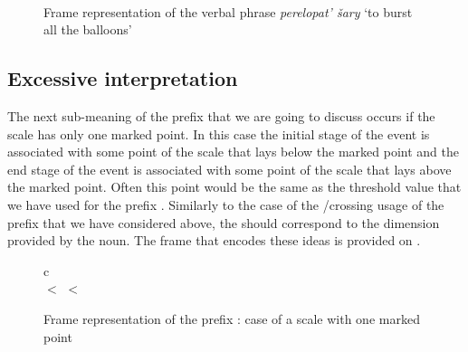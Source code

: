 \begin{figure}
\centering
{}\\
\hfill
\caption{Frame representation of the verbal phrase \textit{perelopat' \v{s}ary} `to burst all the balloons' \label{frame:pereburst:balloon}}
\end{figure}

\subsection{Excessive interpretation}
The next sub-meaning of the prefix  that we are going to discuss occurs if the scale has only one marked point. In this case the initial stage of the event is associated with some point of the scale that lays below the marked point and the end stage of the event is associated with some point of the scale that lays above the marked point. Often this point would be the same as the threshold value that we have used for the prefix . Similarly to the case of the /crossing usage of the prefix  that we have considered above, the  should correspond to the dimension provided by the noun. The frame that encodes these ideas is provided on .
\begin{figure}
\begin{center}
\begin{tabular}{c}
\\
 $<$  $<$ 
\end{tabular}
\end{center}
\caption{Frame representation of the prefix : case of a scale with one marked point \label{frame:pere:over}}
\end{figure}

